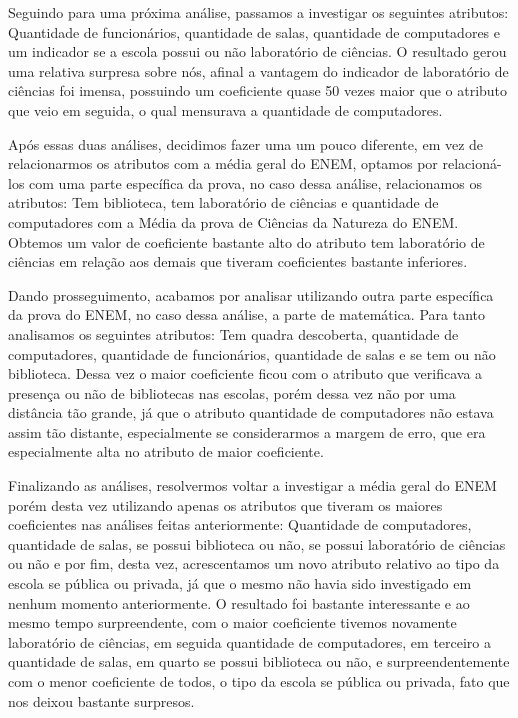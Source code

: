 \documentclass[review]{elsarticle}
\begin{document}
Seguindo para uma próxima análise, passamos a investigar os seguintes atributos: Quantidade de funcionários, quantidade de salas, quantidade de computadores e um indicador se a escola possui ou não laboratório de ciências. O resultado gerou uma relativa surpresa sobre nós, afinal a vantagem do indicador de laboratório de ciências foi imensa, possuindo um coeficiente quase 50 vezes maior que o atributo que veio em seguida, o qual mensurava a quantidade de computadores.

Após essas duas análises, decidimos fazer uma um pouco diferente, em vez de relacionarmos os atributos com a média geral do ENEM, optamos por relacioná-los com uma parte específica da prova, no caso dessa análise, relacionamos os atributos: Tem biblioteca, tem laboratório de ciências e quantidade de computadores com a Média da prova de Ciências da Natureza do ENEM. Obtemos um valor de coeficiente bastante alto do atributo tem laboratório de ciências em relação aos demais que tiveram coeficientes bastante inferiores.

Dando prosseguimento, acabamos por analisar utilizando outra parte específica da prova do ENEM, no caso dessa análise, a parte de matemática. Para tanto analisamos os seguintes atributos: Tem quadra descoberta, quantidade de computadores, quantidade de funcionários, quantidade de salas e se tem ou não biblioteca. Dessa vez o maior coeficiente ficou com o atributo que verificava a presença ou não de bibliotecas nas escolas, porém dessa vez não por uma distância tão grande, já que o atributo quantidade de computadores não estava assim tão distante, especialmente se considerarmos a margem de erro, que era especialmente alta no atributo de maior coeficiente.

Finalizando as análises, resolvermos voltar a investigar a média geral do ENEM porém desta vez utilizando apenas os atributos que tiveram os maiores coeficientes nas análises feitas anteriormente: Quantidade de computadores, quantidade de salas, se possui biblioteca ou não, se possui laboratório de ciências ou não e por fim, desta vez, acrescentamos um novo atributo relativo ao tipo da escola se pública ou privada, já que o mesmo não havia sido investigado em nenhum momento anteriormente. O resultado foi bastante interessante e ao mesmo tempo surpreendente, com o maior coeficiente tivemos novamente laboratório de ciências, em seguida quantidade de computadores, em terceiro a quantidade de salas, em quarto se possui biblioteca ou não, e surpreendentemente com o menor coeficiente de todos, o tipo da escola se pública ou privada, fato que nos deixou bastante surpresos.
\end{document}
